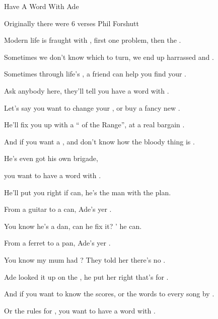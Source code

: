 \begin{SBSong}{Have A Word With Ade}

  {Originally there were 6 verses}
  {Phil Forshutt}
  \begin{SBVerse}
	Modern life is fraught with , first one problem, \WBLineBrk then the .
	
	Sometimes we don't know which  to turn, we end up harrassed and .
	
	Sometimes through life's , a friend can help you \WBLineBrk find your .
	
	Ask anybody  here, they'll tell you have a word with . 
	
	Let's say you want to change your , or buy a fancy new .
	
	He'll fix you up with a `` of the Range'', at a real bargain .
	
	And if you want a , and don't know how \WBLineBrk the bloody thing is .
	
	He's even got his own  brigade, 

    you want to have a word with . 
  \end{SBVerse}
  \begin{SBChorus}
    He'll put you right if  can, he's the man with \WBLineBrk the  plan.
    
    From a guitar to a  can, Ade's yer .
    
    You know he's a  dan, can he fix it? ' he can.
    
    From a ferret to a  pan, Ade's yer . 
  \end{SBChorus}
  \begin{SBVerse}
    You know my mum had ?  They told her there's no .
    
    Ade looked it up on the , he put her right that's for .
    
    And if you want to know the  scores, or the words to every song by .
    
    Or the rules for , you want to have a word with . 
    

\end{SBVerse}
\end{SBSong}
